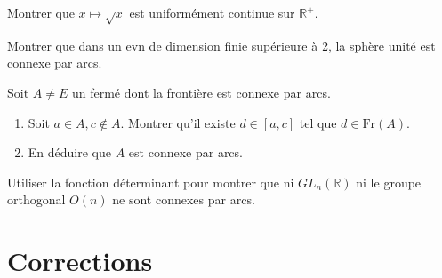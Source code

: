 \begin{exercice}
Montrer que $x \mapsto \sqrt{x}$ est uniformément continue sur $\mathbb{R}^{+}$.
\end{exercice}

\begin{exercice}
Montrer que dans un evn de dimension finie supérieure à 2, la sphère unité est connexe par arcs.
\end{exercice}

\begin{exercice}
Soit $A \neq E$ un fermé dont la frontière est connexe par arcs.
\begin{enumerate}
    \item Soit $a \in A, c \notin A$. Montrer qu'il existe $d \in [a,c]$ tel que $d \in \text{Fr}(A)$.
    \item En déduire que $A$ est connexe par arcs.
\end{enumerate}
\end{exercice}

\begin{exercice}
Utiliser la fonction déterminant pour montrer que ni $GL_{n}(\mathbb{R})$ ni le groupe orthogonal $O(n)$ ne sont connexes par arcs.
\end{exercice}

\newpage
\section{Corrections}

